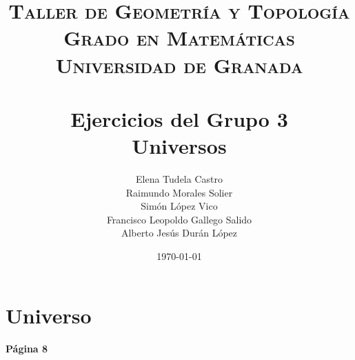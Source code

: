 
\usepackage{listings}
\usepackage{dsfont}
\usepackage{booktabs}

\title{	
\normalfont \normalsize 
\textsc{\textbf{Taller de Geometría y Topología} \\ Grado en Matemáticas \\ Universidad de Granada} \\ [25pt] %
\horrule{0.5pt} \\[0.4cm] %
\huge Ejercicios del Grupo 3  \\ %
Universos
\horrule{2pt} \\[0.5cm] %
}
\author{	
		Elena Tudela Castro \\
		Raimundo Morales Solier \\
		Simón López Vico \\
		Francisco Leopoldo Gallego Salido \\
		Alberto Jesús Durán López} %
\date{\normalsize\today} %




\maketitle %

\newpage %






\section{Universo}

\textbf{Página 8}

